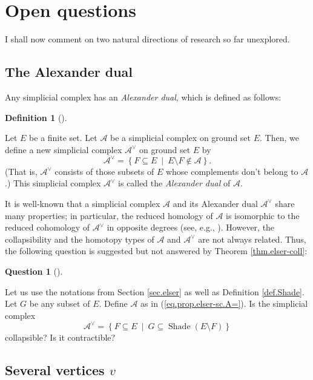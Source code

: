 \documentclass[numbers=enddot,12pt,final,onecolumn]{scrartcl}%
\theoremstyle{definition}
\newtheorem{defi}[theo]{Definition}
\newenvironment{definition}[1][]
{\begin{defi}[#1]\begin{leftbar}}
{\end{leftbar}\end{defi}}
\newtheorem{quest}[theo]{Question}
\newenvironment{question}[1][]
{\begin{quest}[#1]\begin{leftbar}}
{\end{leftbar}\end{quest}}
\newenvironment{question}[1][Question]{\noindent\textbf{#1.} }{\ \rule{0.5em}{0.5em}}
\begin{document}
\section{Open questions}

I shall now comment on two natural directions of research so far unexplored.

\subsection{The Alexander dual}

Any simplicial complex has an \emph{Alexander dual}, which is defined as follows:

\begin{definition}
Let $E$ be a finite set. Let $\mathcal{A}$ be a simplicial complex on ground
set $E$. Then, we define a new simplicial complex $\mathcal{A}^{\vee}$ on
ground set $E$ by%
\[
\mathcal{A}^{\vee}=\left\{  F\subseteq E\ \mid\ E\setminus F\notin%
\mathcal{A}\right\}  .
\]
(That is, $\mathcal{A}^{\vee}$ consists of those subsets of $E$ whose
complements don't belong to $\mathcal{A}$.) This simplicial complex
$\mathcal{A}^{\vee}$ is called the \emph{Alexander dual} of $\mathcal{A}$.
\end{definition}

It is well-known that a simplicial complex $\mathcal{A}$ and its Alexander
dual $\mathcal{A}^{\vee}$ share many properties; in particular, the reduced
homology of $\mathcal{A}$ is isomorphic to the reduced cohomology of
$\mathcal{A}^{\vee}$ in opposite degrees
(see, e.g., \cite[Theorem 1.1]{BjoTan09}). However, the
collapsibility and the homotopy types of $\mathcal{A}$ and $\mathcal{A}^{\vee
}$ are not always related. Thus, the following question is suggested but not
answered by Theorem \ref{thm.elser-coll}:

\begin{question}
\label{quest.elser-dual}Let us use the notations from Section \ref{sec.elser}
as well as Definition \ref{def.Shade}. Let $G$ be any subset of $E$. Define
$\mathcal{A}$ as in (\ref{eq.prop.elser-sc.A=}). Is the simplicial complex
\[
\mathcal{A}^{\vee}=\left\{  F\subseteq E\ \mid\ G\subseteq
\operatorname*{Shade}\left(  E\setminus F\right)  \right\}
\]
collapsible? Is it contractible?
\end{question}

\subsection{Several vertices $v$}
\end{document}
